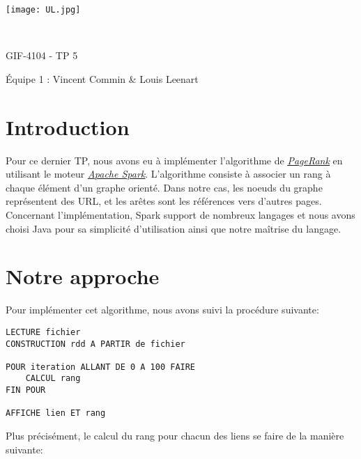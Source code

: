 \documentclass[a4paper, french]{article}
\author{Vincent Commin \& Louis Leenart}
\date{\today}
\begin{document}
\begin{titlepage}
    \begin{flushleft}
        \texttt{[image: UL.jpg]}\par
        \centering

        \vspace{13\baselineskip}
        \HRule \\[0.4cm]

        {\Huge
        GIF-4104 - TP 5\par}
        \vspace{0.4cm}
        \HRule
        \vfill
        Équipe 1 : Vincent Commin \& Louis Leenart\medskip \par
    \end{flushleft}
\end{titlepage}

\newpage
\section{Introduction}

Pour ce dernier TP, nous avons eu à implémenter l'algorithme de \href{https://en.wikipedia.org/wiki/PageRank}{\textit{\underline{PageRank}}} en utilisant le moteur \href{https://spark.apache.org/}{\textit{\underline{Apache Spark}}}. L'algorithme consiste à associer un rang à chaque élément d'un graphe orienté. Dans notre cas, les noeuds du graphe représentent des URL, et les arêtes sont les références vers d'autres pages. Concernant l'implémentation, Spark support de nombreux langages et nous avons choisi Java pour sa simplicité d'utilisation ainsi que notre maîtrise du langage.

\section{Notre approche}

Pour implémenter cet algorithme, nous avons suivi la procédure suivante:

\begin{lstlisting}[style=txt]
LECTURE fichier
CONSTRUCTION rdd A PARTIR de fichier

POUR iteration ALLANT DE 0 A 100 FAIRE
    CALCUL rang
FIN POUR

AFFICHE lien ET rang
\end{lstlisting}

Plus précisément, le calcul du rang pour chacun des liens se faire de la manière suivante:
\end{document}

